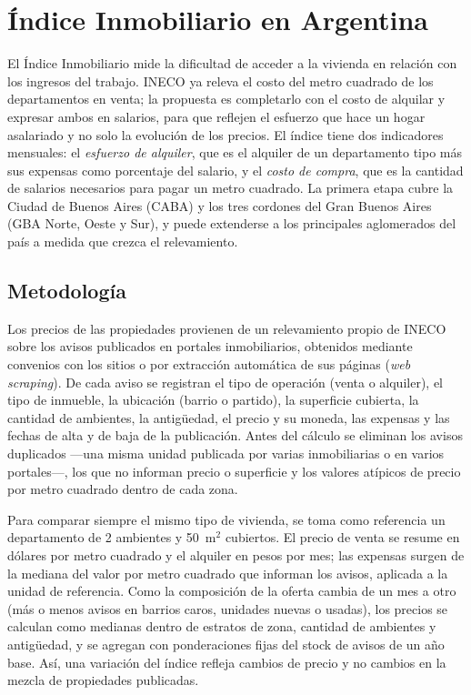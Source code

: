 \section{Índice Inmobiliario en Argentina}

El Índice Inmobiliario mide la dificultad de acceder a la vivienda en relación con los ingresos del trabajo. INECO ya releva el costo del metro cuadrado de los departamentos en venta; la propuesta es completarlo con el costo de alquilar y expresar ambos en salarios, para que reflejen el esfuerzo que hace un hogar asalariado y no solo la evolución de los precios. El índice tiene dos indicadores mensuales: el \emph{esfuerzo de alquiler}, que es el alquiler de un departamento tipo más sus expensas como porcentaje del salario, y el \emph{costo de compra}, que es la cantidad de salarios necesarios para pagar un metro cuadrado. La primera etapa cubre la Ciudad de Buenos Aires (CABA) y los tres cordones del Gran Buenos Aires (GBA Norte, Oeste y Sur), y puede extenderse a los principales aglomerados del país a medida que crezca el relevamiento.

\subsection{Metodología}

Los precios de las propiedades provienen de un relevamiento propio de INECO sobre los avisos publicados en portales inmobiliarios, obtenidos mediante convenios con los sitios o por extracción automática de sus páginas (\emph{web scraping}). De cada aviso se registran el tipo de operación (venta o alquiler), el tipo de inmueble, la ubicación (barrio o partido), la superficie cubierta, la cantidad de ambientes, la antigüedad, el precio y su moneda, las expensas y las fechas de alta y de baja de la publicación. Antes del cálculo se eliminan los avisos duplicados ---una misma unidad publicada por varias inmobiliarias o en varios portales---, los que no informan precio o superficie y los valores atípicos de precio por metro cuadrado dentro de cada zona.

Para comparar siempre el mismo tipo de vivienda, se toma como referencia un departamento de 2 ambientes y 50~m$^2$ cubiertos. El precio de venta se resume en dólares por metro cuadrado y el alquiler en pesos por mes; las expensas surgen de la mediana del valor por metro cuadrado que informan los avisos, aplicada a la unidad de referencia. Como la composición de la oferta cambia de un mes a otro (más o menos avisos en barrios caros, unidades nuevas o usadas), los precios se calculan como medianas dentro de estratos de zona, cantidad de ambientes y antigüedad, y se agregan con ponderaciones fijas del stock de avisos de un año base. Así, una variación del índice refleja cambios de precio y no cambios en la mezcla de propiedades publicadas.

